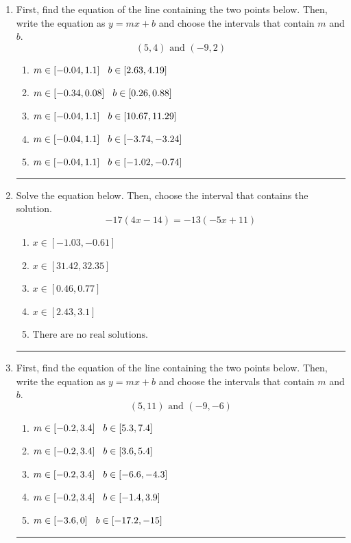 \documentclass[14pt]{extbook}
\newcommand{\litem}[1]{\item#1\hspace*{-1cm}\rule{\textwidth}{0.4pt}}
\begin{document}
\begin{enumerate}
{\begin{enumerate}[label=\Alph*.]
\end{enumerate} }
\litem{
First, find the equation of the line containing the two points below. Then, write the equation as $ y=mx+b $ and choose the intervals that contain $m$ and $b$.\[ (5, 4) \text{ and } (-9, 2) \]\begin{enumerate}[label=\Alph*.]
\item \( m \in [-0.04, 1.1] \hspace*{3mm} b \in [2.63, 4.19] \)
\item \( m \in [-0.34, 0.08] \hspace*{3mm} b \in [0.26, 0.88] \)
\item \( m \in [-0.04, 1.1] \hspace*{3mm} b \in [10.67, 11.29] \)
\item \( m \in [-0.04, 1.1] \hspace*{3mm} b \in [-3.74, -3.24] \)
\item \( m \in [-0.04, 1.1] \hspace*{3mm} b \in [-1.02, -0.74] \)

\end{enumerate} }
\litem{
Solve the equation below. Then, choose the interval that contains the solution.\[ -17(4x -14) = -13(-5x + 11) \]\begin{enumerate}[label=\Alph*.]
\item \( x \in [-1.03, -0.61] \)
\item \( x \in [31.42, 32.35] \)
\item \( x \in [0.46, 0.77] \)
\item \( x \in [2.43, 3.1] \)
\item \( \text{There are no real solutions.} \)

\end{enumerate} }
\litem{
First, find the equation of the line containing the two points below. Then, write the equation as $ y=mx+b $ and choose the intervals that contain $m$ and $b$.\[ (5, 11) \text{ and } (-9, -6) \]\begin{enumerate}[label=\Alph*.]
\item \( m \in [-0.2, 3.4] \hspace*{3mm} b \in [5.3, 7.4] \)
\item \( m \in [-0.2, 3.4] \hspace*{3mm} b \in [3.6, 5.4] \)
\item \( m \in [-0.2, 3.4] \hspace*{3mm} b \in [-6.6, -4.3] \)
\item \( m \in [-0.2, 3.4] \hspace*{3mm} b \in [-1.4, 3.9] \)
\item \( m \in [-3.6, 0] \hspace*{3mm} b \in [-17.2, -15] \)


\end{enumerate}}
\end{enumerate}
\end{document}
